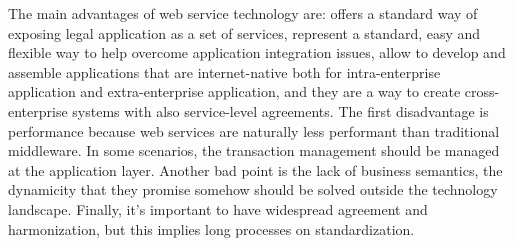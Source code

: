 The main advantages of web service technology are: offers a standard way of exposing legal application as a set of services, represent a standard, easy and flexible way to help overcome application integration issues, allow to develop and assemble applications that are internet-native both for intra-enterprise application and extra-enterprise application, and they are a way to create cross-enterprise systems with also service-level agreements.
The first disadvantage is performance because web services are naturally less performant than traditional middleware.
In some scenarios, the transaction management should be managed at the application layer. Another bad point is the lack of business semantics, the dynamicity that they promise somehow should be solved outside the technology landscape. Finally, it's important to have widespread agreement and harmonization, but this implies long processes on standardization.

